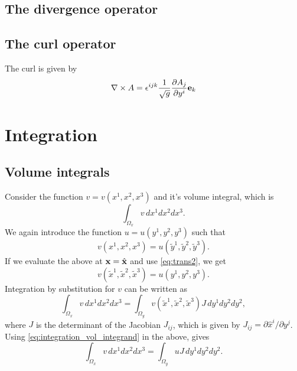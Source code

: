 \documentclass[11pt]{article}
\newcommand{\xtilde}{\tilde{x}}
\newcommand{\ytilde}{\tilde{y}}
\begin{document}
\subsection{The divergence operator}

\subsection{The curl operator}
The curl is given by
\begin{equation}
    \nabla \times A = \epsilon^{ijk} \frac{1}{\sqrt{g}} \frac{\partial A_j}{\partial y^i} \mathbf{e}_k
\end{equation}

\section{Integration}

\subsection{Volume integrals}
Consider the function $v = v(x^1, x^2, x^3)$ and it's volume integral, which is
\begin{equation}
    \int_{\Omega_x} v \, dx^1 dx^2 dx^3.
\end{equation}
We again introduce the function $u = u(y^1, y^2, y^3)$ such that
\begin{equation}
    v(x^1, x^2, x^3) = u(\ytilde^1, \ytilde^2, \ytilde^3).
\end{equation}
If we evaluate the above at $\mathbf{x} = \hat{\mathbf{x}}$ and use \cref{eq:trans2}, we get
\begin{equation}
    \label{eq:integration_vol_integrand}
    v(\xtilde^1, \xtilde^2, \xtilde^3) = u(y^1, y^2, y^3).
\end{equation}
Integration by substitution for $v$ can be written as
\begin{equation}
    \int_{\Omega_x} v \, dx^1 dx^2 dx^3 = \int_{\Omega_y} v(\xtilde^1, \xtilde^2, \xtilde^3) J \, dy^1 dy^2 dy^2,
\end{equation}
where $J$ is the determinant of the Jacobian $J_{ij}$, which is given by $J_{ij} = \partial \hat{x}^i / \partial y^j$.
Using \cref{eq:integration_vol_integrand} in the above, gives
\begin{equation}
    \int_{\Omega_x} v \, dx^1 dx^2 dx^3 = \int_{\Omega_y} u J \, dy^1 dy^2 dy^2.
\end{equation}
\end{document}
